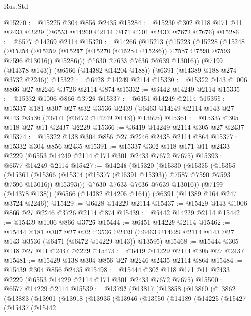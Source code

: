 \begin{lexlean}{RustStd}
\begin{coremodule}
@15270 := @15225 @304 @856 @2435
@15284 := @15230 @302 @118 @171 @11 @2433 @2229 (@6553 @14269 @2114 @171 @301 @2433 @7672 @7676)
@15286 := @6577 @14269 @2114
@15320 := @14266
    (@15213
      (@15223
        (@15228
          (@15248
            (@15254
              (@15259 (@15267 (@15270 (@15284 @15286)) @7587 @7590 @7593 @7596 @13016))
              @15286)))
        @7630
        @7633
        @7636
        @7639
        @13016))
    (@7199 (@14378 @143))
    (@6566 (@14382 @14204 @188))
    (@6391 (@14389 @188 @274 @3732 @2246))
@15322 := @6428 @14249 @2114
@15330 := @15322 @143 @1006 @866 @27 @2246 @3726 @2114 @874
@15332 := @6442 @14249 @2114
@15335 := @15332 @1006 @866 @3726
@15337 := @6451 @14249 @2114
@15355 := @15337
    @181
    @307
    @27
    @32
    @3536
    @2439
    (@6463 @14249 @2114 @143 @27 @143 @3536 (@6471 (@6472 @14249 @143)) @13595)
@15361 := @15337 @305 @118 @27 @11 @2437 @2229
@15366 := @6419 @14249 @2114 @305 @27 @2437
@15374 := @15322 @138 @304 @856 @27 @2246 @2435 @2114 @864
@15377 := @15332 @304 @856 @2435
@15391 := @15337 @302 @118 @171 @11 @2433 @2229 (@6553 @14249 @2114 @171 @301 @2433 @7672 @7676)
@15393 := @6577 @14249 @2114
@15427 := @14246
    (@15320
      (@15330
        (@15335
          (@15355
            (@15361
              (@15366 (@15374 (@15377 (@15391 @15393)) @7587 @7590 @7593 @7596 @13016))
              @15393)))
        @7630
        @7633
        @7636
        @7639
        @13016))
    (@7199 (@14378 @138))
    (@6566 (@14382 @14205 @164))
    (@6391 (@14389 @164 @247 @3724 @2246))
@15429 := @6428 @14229 @2114
@15437 := @15429 @143 @1006 @866 @27 @2246 @3726 @2114 @874
@15439 := @6442 @14229 @2114
@15442 := @15439 @1006 @866 @3726
@15444 := @6451 @14229 @2114
@15462 := @15444
    @181
    @307
    @27
    @32
    @3536
    @2439
    (@6463 @14229 @2114 @143 @27 @143 @3536 (@6471 (@6472 @14229 @143)) @13595)
@15468 := @15444 @305 @118 @27 @11 @2437 @2229
@15473 := @6419 @14229 @2114 @305 @27 @2437
@15481 := @15429 @138 @304 @856 @27 @2246 @2435 @2114 @864
@15484 := @15439 @304 @856 @2435
@15498 := @15444 @302 @118 @171 @11 @2433 @2229 (@6553 @14229 @2114 @171 @301 @2433 @7672 @7676)
@15500 := @6577 @14229 @2114
@15539 := @13792
    (@13817
      (@13858
        (@13860
          (@13862
            (@13883
              (@13901
                (@13918
                  (@13935
                    (@13946
                      (@13950
                        (@14189
                          (@14225
                            (@15427
                              (@15437
                                (@15442

\end{coremodule}
\end{lexlean}
